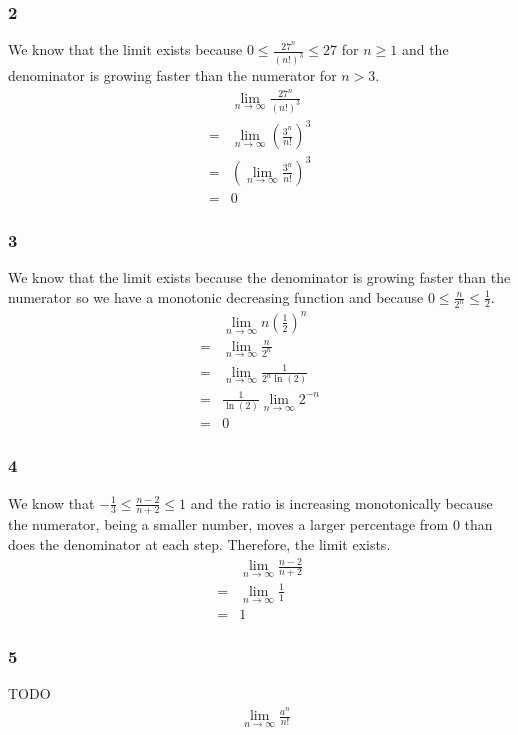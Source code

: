 \documentclass[12pt]{article}
\newcommand{\round}[1]{\left(       #1 \right)      }
\begin{document}
\subsubsection*{2}
We know that the limit exists because $0 \leq \frac{27^n}{(n!)^3} \leq 27$ for $n \geq 1$ and the denominator is growing faster than the numerator for $n > 3$.
\begin{align*}
     & \lim_{n\to\infty} \frac{27^n}{(n!)^3} \\
    =& \lim_{n\to\infty} \round{\frac{3^n}{n!}}^3 \\
    =& \round{\lim_{n\to\infty} \frac{3^n}{n!}}^3 \\
    =& 0
\end{align*}

\subsubsection*{3}
We know that the limit exists because the denominator is growing faster than the numerator so we have a monotonic decreasing function and because $0 \leq \frac{n}{2^n} \leq \frac{1}{2}$.
\begin{align*}
     & \lim_{n\to\infty} n \round{\frac{1}{2}}^n \\
    =& \lim_{n\to\infty} \frac{n}{2^n} \\
    =& \lim_{n\to\infty} \frac{1}{2^n \ln(2)} \\
    =& \frac{1}{\ln(2)} \lim_{n\to\infty} 2^{-n} \\
    =& 0
\end{align*}

\subsubsection*{4}
We know that $-\frac{1}{3} \leq \frac{n-2}{n+2} \leq 1$ and the ratio is increasing monotonically because the numerator, being a smaller number, moves a larger percentage from 0 than does the denominator at each step. Therefore, the limit exists.
\begin{align*}
     & \lim_{n\to\infty} \frac{n - 2}{n + 2} \\
    =& \lim_{n\to\infty} \frac{1}{1} \\
    =& 1
\end{align*}

\subsubsection*{5}
TODO
\begin{align*}
     & \lim_{n\to\infty} \frac{a^n}{n!}
\end{align*}
\end{document}
